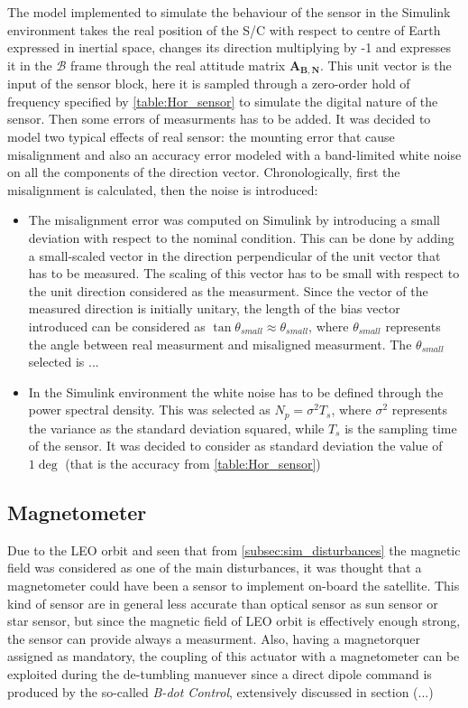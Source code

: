 The model implemented to simulate the behaviour of the sensor in the Simulink environment takes the real position of the S/C with respect to centre of Earth expressed in inertial space, changes its direction multiplying by -1 and expresses it in the $\mathcal{B}$ frame through the real attitude matrix $\boldsymbol{A_{B,N}}$. 
This unit vector is the input of the sensor block, here it is sampled through a zero-order hold of frequency specified by
\autoref{table:Hor_sensor} to simulate the digital nature of the sensor. Then some errors of measurments has to be added.
It was decided to model two typical effects of real sensor: the mounting error that cause misalignment and also an 
accuracy error modeled with a band-limited white noise on all the components of the direction vector.
Chronologically, first the misalignment is calculated, then the noise is introduced:
\begin{itemize}
    \item The misalignment error was computed on Simulink by introducing a small deviation with respect to the nominal condition. This can
    be done by adding a small-scaled vector in the direction perpendicular of the unit vector that has to be measured. The scaling of 
    this vector has to be small with respect to the unit direction considered as the measurment. Since the vector of the measured 
    direction is initially unitary, the length of the bias vector introduced can be considered as $\tan{\theta_{small}} \approx \theta_{small}$,
    where $\theta_{small}$ represents the angle between real measurment and misaligned measurment. The $\theta_{small}$ selected is ... 
    \item In the Simulink environment the white noise has to be defined through the power spectral density. This was selected as $N_p = \sigma^2 {T_s} $, 
    where $\sigma^2$ represents the variance as the standard deviation squared, while $T_s$ is the sampling time of the sensor.
    It was decided to consider as standard deviation the value of $1\deg$ (that is the accuracy from \autoref{table:Hor_sensor})
\end{itemize}


\subsection{Magnetometer}
Due to the LEO orbit and seen that from \autoref{subsec:sim_disturbances} the magnetic field  was considered as one of the main disturbances, 
it was thought that a magnetometer could have been a sensor to implement on-board the satellite. This kind of sensor are in general less accurate 
than optical sensor as sun sensor or star sensor, but since the magnetic field of LEO orbit is effectively enough strong, the sensor can provide 
always a measurment. Also, having a magnetorquer assigned as mandatory, the coupling of this actuator with a magnetometer can be exploited during 
the de-tumbling manuever since a direct dipole command is produced by the so-called \textit{B-dot Control}, extensively discussed in section (...)

